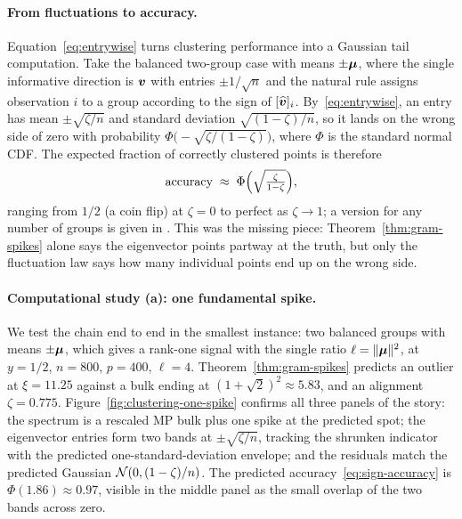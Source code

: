 \paragraph{From fluctuations to accuracy.}
Equation~\eqref{eq:entrywise} turns clustering performance into a Gaussian tail computation. Take the balanced two-group case with means \(\pm\bm{\mu}\), where the single informative direction is \(\bm{v}\) with entries \(\pm 1/\sqrt{n}\) and the natural rule assigns observation \(i\) to a group according to the sign of \([\widehat{\bm{v}}]_i\). By~\eqref{eq:entrywise}, an entry has mean \(\pm\sqrt{\zeta/n}\) and standard deviation \(\sqrt{(1-\zeta)/n}\), so it lands on the wrong side of zero with probability \(\Phi\bigl(-\sqrt{\zeta/(1-\zeta)}\bigr)\), where \(\Phi\) is the standard normal CDF. The expected fraction of correctly clustered points is therefore
\begin{equation}
  \text{accuracy} \;\approx\; \Phi\Bigl(\sqrt{\tfrac{\zeta}{1 - \zeta}}\Bigr),
  \label{eq:sign-accuracy}
\end{equation}
ranging from \(1/2\) (a coin flip) at \(\zeta = 0\) to perfect as \(\zeta \to 1\); a version for any number of groups is given in \citet{LebeauChatelainCouillet2024}. This was the missing piece: Theorem~\ref{thm:gram-spikes} alone says the eigenvector points partway at the truth, but only the fluctuation law says how many individual points end up on the wrong side.

\paragraph{Computational study (a): one fundamental spike.}
We test the chain end to end in the smallest instance: two balanced groups with means \(\pm \bm{\mu}\), which gives a rank-one signal with the single ratio \(\ell = \lVert\bm{\mu}\rVert^2\), at \(y = 1/2\), \(n = 800\), \(p = 400\), \(\ell = 4\). Theorem~\ref{thm:gram-spikes} predicts an outlier at \(\xi = 11.25\) against a bulk ending at \((1 + \sqrt{2})^2 \approx 5.83\), and an alignment \(\zeta = 0.775\). Figure~\ref{fig:clustering-one-spike} confirms all three panels of the story: the spectrum is a rescaled MP bulk plus one spike at the predicted spot; the eigenvector entries form two bands at \(\pm\sqrt{\zeta/n}\), tracking the shrunken indicator with the predicted one-standard-deviation envelope; and the residuals match the predicted Gaussian \(\mathcal{N}(0, (1-\zeta)/n)\). The predicted accuracy~\eqref{eq:sign-accuracy} is \(\Phi(1.86) \approx 0.97\), visible in the middle panel as the small overlap of the two bands across zero.

